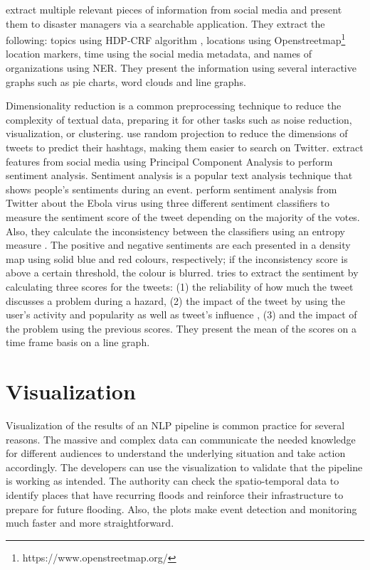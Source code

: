  extract multiple relevant pieces of information from
social media and present them to disaster managers via a searchable application. They extract the
following: topics using HDP-CRF algorithm \cite{tehHierarchicalBayesianNonparametric2010}, locations
using Openstreetmap\footnote{https://www.openstreetmap.org/} location markers, time using the social
media metadata, and names of organizations using \ac{NER}. They present the information using
several interactive graphs such as pie charts, word clouds and line graphs.

Dimensionality reduction is a common preprocessing technique to reduce the complexity of textual
data, preparing it for other tasks such as noise reduction, visualization, or clustering.
 use random projection to reduce the
dimensions of tweets to predict their hashtags, making them easier to search on Twitter.
 extract features from social media using Principal
Component Analysis to perform sentiment analysis. Sentiment analysis is a popular text analysis
technique that shows people's sentiments during an event. 
perform sentiment analysis from Twitter about the Ebola virus using three different sentiment
classifiers to measure the sentiment score of the tweet depending on the majority of the votes.
Also, they calculate the inconsistency between the classifiers using an entropy measure
\cite{argamon-engelsonCommitteeBasedSampleSelection1999}. The positive and negative sentiments are
each presented in a density map using solid blue and red colours, respectively; if the inconsistency
score is above a certain threshold, the colour is blurred.
 tries to extract the sentiment by calculating
three scores for the tweets: (1) the reliability of how much the tweet discusses a problem during a
hazard, (2) the impact of the tweet by using the user's activity and popularity as well as tweet's
influence \cite{palIdentifyingTopicalAuthorities2011}, (3) and the impact of the
problem using the previous scores. They present the mean of the scores on a time frame basis on a
line graph.

\section{Visualization}
Visualization of the results of an \ac{NLP} pipeline is common practice for several reasons. The
massive and complex data can communicate the needed knowledge for different audiences to understand
the underlying situation and take action accordingly. The developers can use the visualization to
validate that the pipeline is working as intended. The authority can check the spatio-temporal data
to identify places that have recurring floods and reinforce their infrastructure to prepare for
future flooding. Also, the plots make event detection and monitoring much faster and more
straightforward.

